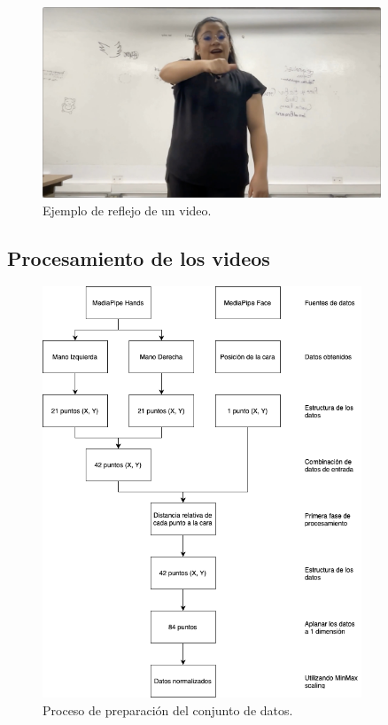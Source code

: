 \begin{figure}[H]
    \centering
    \includegraphics[width=0.9\textwidth]{figuras/EjemploVideo.jpeg}
    \caption{Ejemplo de reflejo de un video.}
    \label{fig:reflejo}
\end{figure}

\subsection{Procesamiento de los videos}

\begin{figure}[H]
    \centering
    \includegraphics[width=0.85\textwidth]{figuras/DataPipeline.png}
    \caption{Proceso de preparación del conjunto de datos.}
    \label{fig:dataset_pipeline}
\end{figure}

